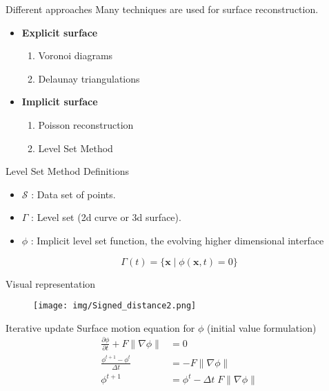 \documentclass{beamer}
\begin{document}
\begin{frame}{Different approaches}
  Many techniques are used for surface reconstruction.
  \begin{itemize} %
  \item \textbf{Explicit surface} %
  \begin{enumerate}
    \item Voronoi diagrams %
    \item Delaunay triangulations
  \end{enumerate}
  \item \textbf{Implicit surface} %
  \begin{enumerate}
    \item Poisson reconstruction
    \item Level Set Method
  \end{enumerate}
  \end{itemize}
\end{frame}

\begin{frame}{Level Set Method}
Definitions
\begin{itemize}
\item $\mathcal{S}$ : Data set of points.
\item $\Gamma$ : Level set (2d curve or 3d surface).
\item $\phi$ : Implicit level set function, the evolving higher dimensional interface 
\end{itemize}

\[
\Gamma(t) = \{\mathbf{x} \; | \; \phi(\mathbf{x},t) = 0\}
\]
\end{frame}
\begin{frame}{Visual representation}
\begin{figure}[H]
\centering
\texttt{[image: img/Signed\_distance2.png]}
\end{figure}
\end{frame}
\begin{frame}{Iterative update}
Surface motion equation for $\phi$ (initial value formulation)
\begin{align}
    \frac{\partial \phi}{\partial t} + F \|\nabla \phi\| &= 0 \\
    \frac{\phi^{t+1} - \phi^{t}}{\Delta t} &=  -F \|\nabla \phi\| \\
    \phi^{t+1} &= \phi^{t} - \Delta t \; F \|\nabla \phi\| 
\end{align}
\end{frame}
\end{document}
